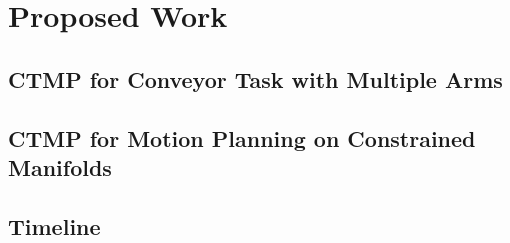 \documentclass[a4paper,10pt]{article}
\begin{document}
\section{Proposed Work}
\subsection{CTMP for Conveyor Task with Multiple Arms}
\subsection{CTMP for Motion Planning on Constrained Manifolds}
\subsection{Timeline}




\newpage



\end{document}
